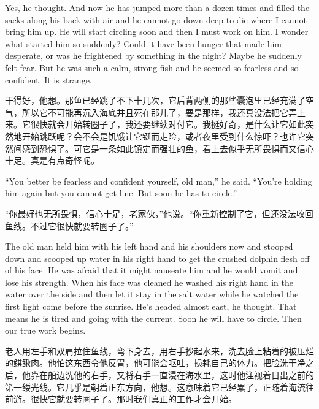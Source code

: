 \begin{paracol}{2}
\switchcolumn*

Yes, he thought. And now he has jumped more than a \gls{dozen} times and
filled the sacks along his back with air and he cannot go down deep to die
where I cannot bring him up. He will start circling soon and then I must
work on him. I wonder what started him so suddenly? Could it have been
hunger that made him desperate, or was he \gls{frightened} by something in
the night? Maybe he suddenly felt fear. But he was such a calm, strong fish
and he seemed so \gls{fearless} and so confident. It is strange.

\switchcolumn

干得好，他想。那鱼已经跳了不下十几次，它后背两侧的那些囊泡里已经充满了空气，所以它不可能再沉入海底并且死在那儿了，要是那样，我还真没法把它弄上来。它很快就会开始转圈子了，我还要继续对付它。我挺好奇，是什么让它如此突然地开始跳跃呢？会不会是饥饿让它铤而走险，或者夜里受到什么惊吓？也许它突然间感到恐惧了。可它是一条如此镇定而强壮的鱼，看上去似乎无所畏惧而又信心十足。真是有点奇怪呢。

\switchcolumn*

``You better be fearless and confident yourself, old man,'' he said.
``You're holding him again but you cannot get line. But soon he has to
circle.''

\switchcolumn

“你最好也无所畏惧，信心十足，老家伙，”他说。“你重新控制了它，但还没法收回鱼线。不过它很快就要转圈子了。”

\switchcolumn*

The old man held him with his left hand and his shoulders now and stooped
down and \gls{scoop}ed up water in his right hand to get the crushed dolphin
flesh off of his face. He was afraid that it might \gls{nauseate} him and he
would vomit and lose his strength. When his face was cleaned he washed his
right hand in the water over the side and then let it stay in the salt water
while he watched the first light come before the sunrise. He's headed almost
east, he thought. That means he is tired and going with the current. Soon he
will have to circle. Then our true work begins.

\switchcolumn

老人用左手和双肩拉住鱼线，弯下身去，用右手抄起水来，洗去脸上粘着的被压烂的鲯鳅肉。他怕这东西令他反胃，他可能会呕吐，损耗自己的体力。把脸洗干净之后，他靠在船边洗他的右手，又将右手一直浸在海水里，这时他注视着日出之前的第一缕光线。它几乎是朝着正东方向，他想。这意味着它已经累了，正随着海流往前游。很快它就要转圈子了。那时我们真正的工作才会开始。


\end{paracol}
